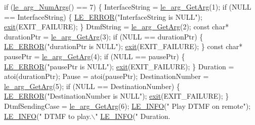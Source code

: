 \begin{DoxyCodeInclude}
{{{{{{{{{{{{    \textcolor{keywordflow}{if} (\hyperlink{le__args_8h_a6fbbeb423104e6eb92fe47ef42b7310a}{le\_arg\_NumArgs}() == 7)
    \{
        InterfaceString = \hyperlink{le__args_8h_a5ebca8229facd069785639cb3c1e273a}{le\_arg\_GetArg}(1);
        \textcolor{keywordflow}{if} (NULL == InterfaceString)
        \{
            \hyperlink{le__log_8h_a353590f91b3143a7ba3a416ae5a50c3d}{LE\_ERROR}(\textcolor{stringliteral}{"InterfaceString is NULL"});
            \hyperlink{app_stop_client_8c_a310220604a584e112ba8f7aa3dfe23f1}{exit}(EXIT\_FAILURE);
        \}
        DtmfString = \hyperlink{le__args_8h_a5ebca8229facd069785639cb3c1e273a}{le\_arg\_GetArg}(2);
        \textcolor{keyword}{const} \textcolor{keywordtype}{char}* durationPtr = \hyperlink{le__args_8h_a5ebca8229facd069785639cb3c1e273a}{le\_arg\_GetArg}(3);
        \textcolor{keywordflow}{if} (NULL == durationPtr)
        \{
            \hyperlink{le__log_8h_a353590f91b3143a7ba3a416ae5a50c3d}{LE\_ERROR}(\textcolor{stringliteral}{"durationPtr is NULL"});
            \hyperlink{app_stop_client_8c_a310220604a584e112ba8f7aa3dfe23f1}{exit}(EXIT\_FAILURE);
        \}
        \textcolor{keyword}{const} \textcolor{keywordtype}{char}* pausePtr = \hyperlink{le__args_8h_a5ebca8229facd069785639cb3c1e273a}{le\_arg\_GetArg}(4);
        \textcolor{keywordflow}{if} (NULL == pausePtr)
        \{
            \hyperlink{le__log_8h_a353590f91b3143a7ba3a416ae5a50c3d}{LE\_ERROR}(\textcolor{stringliteral}{"pausePtr is NULL"});
            \hyperlink{app_stop_client_8c_a310220604a584e112ba8f7aa3dfe23f1}{exit}(EXIT\_FAILURE);
        \}
        Duration = atoi(durationPtr);
        Pause = atoi(pausePtr);
        DestinationNumber = \hyperlink{le__args_8h_a5ebca8229facd069785639cb3c1e273a}{le\_arg\_GetArg}(5);
        \textcolor{keywordflow}{if} (NULL == DestinationNumber)
        \{
            \hyperlink{le__log_8h_a353590f91b3143a7ba3a416ae5a50c3d}{LE\_ERROR}(\textcolor{stringliteral}{"DestinationNumber is NULL"});
            \hyperlink{app_stop_client_8c_a310220604a584e112ba8f7aa3dfe23f1}{exit}(EXIT\_FAILURE);
        \}
        DtmfSendingCase = \hyperlink{le__args_8h_a5ebca8229facd069785639cb3c1e273a}{le\_arg\_GetArg}(6);
        \hyperlink{le__log_8h_a23e6d206faa64f612045d688cdde5808}{LE\_INFO}(\textcolor{stringliteral}{"   Play DTMF on remote"});
        \hyperlink{le__log_8h_a23e6d206faa64f612045d688cdde5808}{LE\_INFO}(\textcolor{stringliteral}{"   DTMF to play.\(\backslash\)"%
        \hyperlink{le__log_8h_a23e6d206faa64f612045d688cdde5808}{LE\_INFO}(\textcolor{stringliteral}{"   Duration.%
}}}}}}}}}}}}}}
\end{DoxyCodeInclude}
